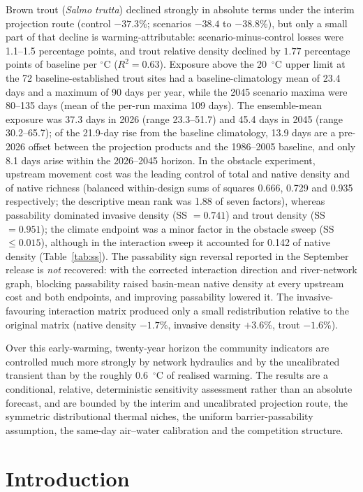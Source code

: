 \documentclass[11pt,a4paper]{article}
\begin{document}
Brown trout (\textit{Salmo trutta}) declined strongly in absolute terms under the interim projection route (control $-37.3$\%; scenarios $-38.4$ to $-38.8$\%), but only a small part of that decline is warming-attributable: scenario-minus-control losses were 1.1--1.5 percentage points, and trout relative density declined by $1.77$ percentage points of baseline per $^\circ$C ($R^2=0.63$). Exposure above the 20~$^\circ$C upper limit at the 72 baseline-established trout sites had a baseline-climatology mean of 23.4 days and a maximum of 90 days per year, while the 2045 scenario maxima were 80--135 days (mean of the per-run maxima 109 days). The ensemble-mean exposure was 37.3 days in 2026 (range 23.3--51.7) and 45.4 days in 2045 (range 30.2--65.7); of the 21.9-day rise from the baseline climatology, 13.9 days are a pre-2026 offset between the projection products and the 1986--2005 baseline, and only 8.1 days arise within the 2026--2045 horizon. In the obstacle experiment, upstream movement cost was the leading control of total and native density and of native richness (balanced within-design sums of squares 0.666, 0.729 and 0.935 respectively; the descriptive mean rank was 1.88 of seven factors), whereas passability dominated invasive density (SS $=0.741$) and trout density (SS $=0.951$); the climate endpoint was a minor factor in the obstacle sweep (SS $\le 0.015$), although in the interaction sweep it accounted for 0.142 of native density (Table~\ref{tab:ss}). The passability sign reversal reported in the September release is \emph{not} recovered: with the corrected interaction direction and river-network graph, blocking passability raised basin-mean native density at every upstream cost and both endpoints, and improving passability lowered it. The invasive-favouring interaction matrix produced only a small redistribution relative to the original matrix (native density $-1.7$\%, invasive density $+3.6$\%, trout $-1.6$\%).

Over this early-warming, twenty-year horizon the community indicators are controlled much more strongly by network hydraulics and by the uncalibrated transient than by the roughly 0.6~$^\circ$C of realised warming. The results are a conditional, relative, deterministic sensitivity assessment rather than an absolute forecast, and are bounded by the interim and uncalibrated projection route, the symmetric distributional thermal niches, the uniform barrier-passability assumption, the same-day air--water calibration and the competition structure.

\section{Introduction}
\end{document}
